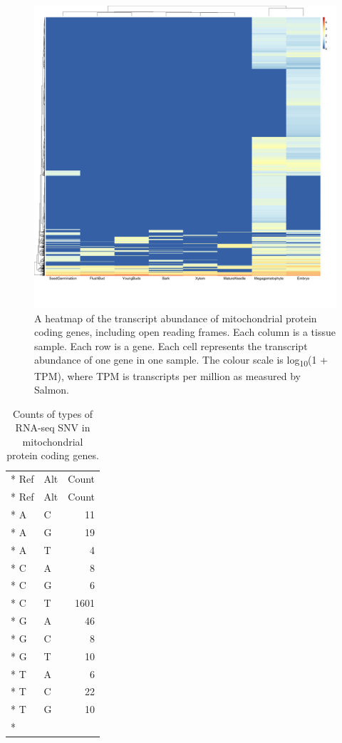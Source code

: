 \documentclass[
  12pt,
  oneside,
  openany]{book}
\begin{document}
\begin{figure}
\hypertarget{fig:mtheatmaporf}{%
\centering
\includegraphics{whitespruce/mt-cds-orf-heatmap.png}
\caption[A heatmap of the transcript abundance of mitochondrial protein coding genes, including open reading frames.]{A heatmap of the transcript abundance of mitochondrial protein coding genes, including open reading frames. Each column is a tissue sample. Each row is a gene. Each cell represents the transcript abundance of one gene in one sample. The colour scale is log\textsubscript{10}(1 + TPM), where TPM is transcripts per million as measured by Salmon.}\label{fig:mtheatmaporf}
}
\end{figure}

\hypertarget{tbl:whitespruce-mtrnasnv}{}
\begin{singlespace}
\small
\begin{longtable}[]{@{}llr@{}}
\caption[Counts of types of RNA-seq SNV in mitochondrial protein coding genes.]{\label{tbl:whitespruce-mtrnasnv}Counts of types of RNA-seq SNV in mitochondrial protein coding genes.}\tabularnewline*
\toprule
Ref & Alt & Count\tabularnewline*
\midrule
\endfirsthead
\toprule
Ref & Alt & Count\tabularnewline*
\midrule
\endhead
A & C & 11\tabularnewline*
A & G & 19\tabularnewline*
A & T & 4\tabularnewline*
C & A & 8\tabularnewline*
C & G & 6\tabularnewline*
C & T & 1601\tabularnewline*
G & A & 46\tabularnewline*
G & C & 8\tabularnewline*
G & T & 10\tabularnewline*
T & A & 6\tabularnewline*
T & C & 22\tabularnewline*
T & G & 10\tabularnewline*
\bottomrule
\end{longtable}
\end{singlespace}
\end{document}
